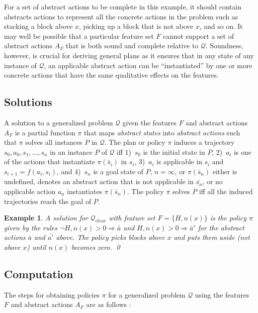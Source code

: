 \documentclass[letterpaper]{article} %
\newtheorem{example}[definition]{Example}
\newcommand{\Q}{\mathcal{Q}}
\newcommand{\Rule}[2]{\ensuremath{#1 \Rightarrow #2}}
\begin{document}
For a set of abstract actions to be complete in this example, it should 
contain abstracts actions to represent all the concrete actions in the
problem such as stacking a block above $x$, picking up a block that is
not above $x$, and so on.
It may well be possible that a particular feature set $F$ cannot support
a set of abstract actions $A_F$ that is both sound and complete relative
to $\Q$. Soundness, however, is crucial for deriving general plans as it
ensures that in any state of any instance of $\Q$, an applicable abstract
action  can be ``instantiated'' by one or more concrete actions that have
the same qualitative effects on the features. 


\subsection{Solutions}

A solution to a generalized problem $\Q$ given the features $F$ and abstract
actions $A_F$ is a partial function $\pi$ that maps \emph{abstract states}
into \emph{abstract actions} such that $\pi$ solves all instances $P$ in $\Q$.
The plan or policy $\pi$ induces a trajectory $s_0,a_0,s_1, \ldots, s_n$ in
an instance $P$ of $\Q$ iff
1)~$s_0$ is the initial state in $P$,
2)~$a_i$ is one of the actions that instantiate $\pi(\bar{s}_i)$ in $s_i$,
3)~$a_i$ is applicable in $s_i$ and $s_{i+1}=f(a_i,s_i)$, and
4)~$s_n$ is a goal state of $P$, $n=\infty$, or $\pi(\bar{s}_n)$ either is
undefined, denotes an abstract action that is not applicable in $\bar{s_n}$,
or no applicable action $a_n$ instantiates $\pi(\bar{s}_n)$.
The policy $\pi$ solves $P$ iff all the induced trajectories reach the
goal of $P$.

\begin{example}
  A solution for $\Q_{clear}$ with feature set
  $F=\{H,n(x)\}$ is the policy $\pi$ given by the rules
  $\Rule{\neg H, n(x)>0}{\bar{a}}$ and $\Rule{H, n(x)>0}{\bar{a}'}$
  for the abstract actions $\bar{a}$ and $\bar{a'}$ above.
  The policy picks blocks above $x$ and puts them aside (not above $x$)
  until $n(x)$ becomes zero. \qed
\end{example}


\subsection{Computation}

The steps for obtaining policies $\pi$ for a generalized problem $\Q$
using the features $F$ and abstract actions $A_F$ are as follows \cite{bonet:ijcai2018}:
\end{document}
